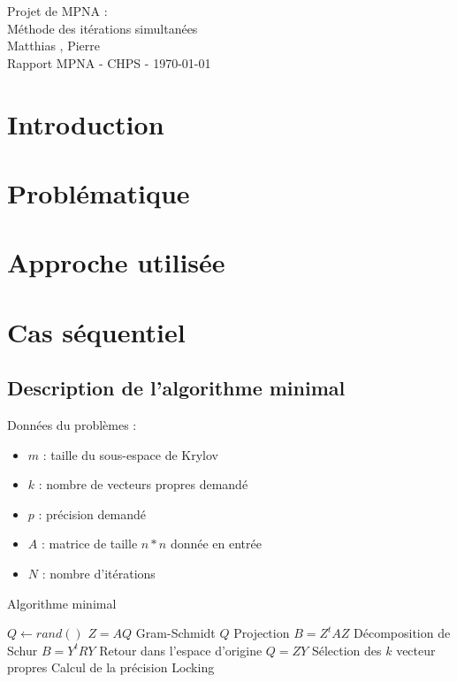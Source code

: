\documentclass[11pt,a4paper]{article}
\begin{document}
\begin{center}

	{\LARGE\centering Projet de MPNA :\\ Méthode des itérations simultanées}\\[1cm]

	{ Matthias , Pierre }\\[0.5cm]
	{Rapport MPNA - CHPS - \today}
\end{center}

\tableofcontents

\section{Introduction}

\section{Problématique}

\section{Approche utilisée}

\section{Cas séquentiel}

	\subsection{Description de l'algorithme minimal}

		Données du problèmes :

		\begin{itemize}
			\item $m$ : taille du sous-espace de Krylov
			\item $k$ : nombre de vecteurs propres demandé
			\item $p$ : précision demandé
			\item $A$ : matrice de taille $n*n$ donnée en entrée
			\item $N$ : nombre d'itérations
		\end{itemize}

		\begin{algorithm}
			\caption{Algorithme minimal}
			\begin{algorithmic}[1]
					\State $Q \gets rand()$
						\State $Z = AQ$
						\State Gram-Schmidt $Q$
						\State Projection $B = Z^tAZ$
						\State Décomposition de Schur $B = Y^tRY$
						\State Retour dans l'espace d'origine $Q = ZY$
						\State Sélection des $k$ vecteur propres
						\State Calcul de la précision
						\State Locking
					\EndWhile
				\end{algorithmic}
		\end{algorithm}
\end{document}
